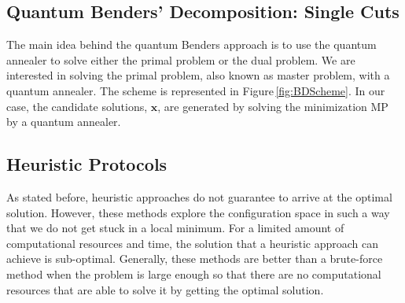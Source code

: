 \subsection{Quantum Benders' Decomposition: Single Cuts}
The main idea behind the quantum Benders approach is to use the quantum annealer to solve either the primal problem or the dual problem. We are interested in solving the primal problem, also known as master problem, with a quantum annealer. The scheme is represented in Figure\,\ref{fig:BDScheme}. In our case, the candidate solutions, $\mathbf{x}$, are generated by solving the minimization MP by a quantum annealer.
\subsection{Heuristic Protocols}
As stated before, heuristic approaches do not guarantee to arrive at the optimal solution. However, these methods explore the configuration space in such a way that we do not get stuck in a local minimum. For a limited amount of computational resources and time, the solution that a heuristic approach can achieve is sub-optimal. Generally, these methods are better than a brute-force method when the problem is large enough so that there are no computational resources that are able to solve it by getting the optimal solution.
